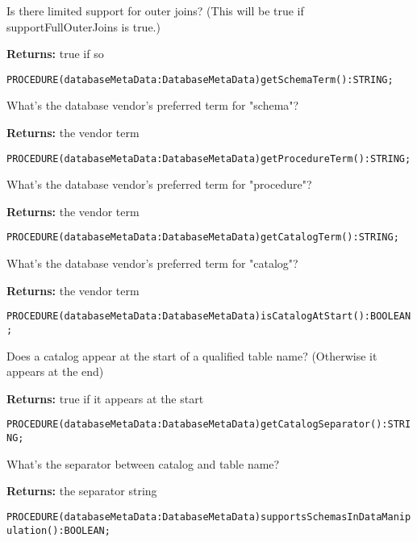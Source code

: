 Is there limited support for outer joins? (This will be true if supportFullOuterJoins is true.) 


{\bf Returns: } 
true if so 




\verb'PROCEDURE(databaseMetaData:DatabaseMetaData)getSchemaTerm():STRING;'






What's the database vendor's preferred term for "schema"? 


{\bf Returns: } 
the vendor term 




\verb'PROCEDURE(databaseMetaData:DatabaseMetaData)getProcedureTerm():STRING;'






What's the database vendor's preferred term for "procedure"? 


{\bf Returns: } 
the vendor term 




\verb'PROCEDURE(databaseMetaData:DatabaseMetaData)getCatalogTerm():STRING;'






What's the database vendor's preferred term for "catalog"? 


{\bf Returns: } 
the vendor term 




\verb'PROCEDURE(databaseMetaData:DatabaseMetaData)isCatalogAtStart():BOOLEAN;'






Does a catalog appear at the start of a qualified table name? (Otherwise it appears at the end) 


{\bf Returns: } 
true if it appears at the start 




\verb'PROCEDURE(databaseMetaData:DatabaseMetaData)getCatalogSeparator():STRING;'






What's the separator between catalog and table name? 


{\bf Returns: } 
the separator string 




\verb'PROCEDURE(databaseMetaData:DatabaseMetaData)supportsSchemasInDataManipulation():BOOLEAN;'






